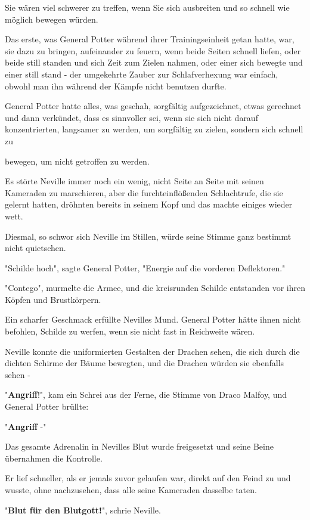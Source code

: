 {Sie wären viel schwerer zu treffen, wenn Sie sich ausbreiten und so schnell wie möglich bewegen würden.

Das erste, was General Potter während ihrer Trainingseinheit getan hatte, war, sie dazu zu bringen, aufeinander zu feuern, wenn beide Seiten schnell liefen, oder beide still standen und sich Zeit zum Zielen nahmen, oder einer sich bewegte und einer still stand - der umgekehrte Zauber zur Schlafverhexung war einfach, obwohl man ihn während der Kämpfe nicht benutzen durfte.

General Potter hatte alles, was geschah, sorgfältig aufgezeichnet, etwas gerechnet und dann verkündet, dass es sinnvoller sei, wenn sie sich nicht darauf konzentrierten, langsamer zu werden, um sorgfältig zu zielen, sondern sich schnell zu

bewegen, um nicht getroffen zu werden.

Es störte Neville immer noch ein wenig, nicht Seite an Seite mit seinen Kameraden zu marschieren, aber die furchteinflößenden Schlachtrufe, die sie gelernt hatten, dröhnten bereits in seinem Kopf und das machte einiges wieder wett.

Diesmal, so schwor sich Neville im Stillen, würde seine Stimme ganz bestimmt nicht quietschen.

"Schilde hoch", sagte General Potter, "Energie auf die vorderen Deflektoren."

"Contego", murmelte die Armee, und die kreisrunden Schilde entstanden vor ihren Köpfen und Brustkörpern.

Ein scharfer Geschmack erfüllte Nevilles Mund. General Potter hätte ihnen nicht befohlen, Schilde zu werfen, wenn sie nicht fast in Reichweite wären.

Neville konnte die uniformierten Gestalten der Drachen sehen, die sich durch die dichten Schirme der Bäume bewegten, und die Drachen würden sie ebenfalls sehen -

"\textbf{Angriff}!", kam ein Schrei aus der Ferne, die Stimme von Draco Malfoy, und General Potter brüllte:

"\textbf{Angriff} -"

Das gesamte Adrenalin in Nevilles Blut wurde freigesetzt und seine Beine übernahmen die Kontrolle.

Er lief schneller, als er jemals zuvor gelaufen war, direkt auf den Feind zu und wusste, ohne nachzusehen, dass alle seine Kameraden dasselbe taten.

"\textbf{Blut für den Blutgott!}", schrie Neville.

}
